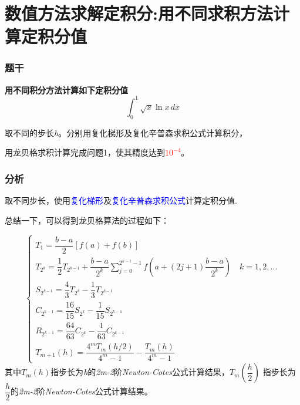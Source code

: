 \documentclass{njureport}
\begin{document}
\makecover
\pagestyle{plain}
\part{数值方法求解定积分:用不同求积方法计算定积分值}

\section{题干}
  \textbf{用不同积分方法计算如下定积分值}
    $$\int _0^1\sqrt{x}\ln{x} \,dx$$

  \begin{description}[itemindent=1em]
  \item[算法1]    取不同的步长\emph{h}。分别用复化梯形及复化辛普森求积公式计算积分，
  \item[算法2]    用龙贝格求积计算完成问题1，使其精度达到\textcolor{red}{$10^{-4}$}。
  \end{description}
\section{分析}
 \begin{description}[itemindent=1em]
  \item[算法1] 取不同步长，使用{\textcolor{blue}{复化梯形}}及{\textcolor{blue}{复化辛普森求积公式}}计算定积分值.
  \item[算法2] 总结一下，可以得到龙贝格算法的过程如下：

$$
    \left\{\begin{array}{lcl}
     T_1=\dfrac{b-a}{2}[f(a)+f(b)]\\[1em]
     T_{2^k}=\dfrac{1}{2}T_{2^{k-1}}+\dfrac{b-a}{2^k} \sum_{j=0}^{2^{k-1}-1}f(a+(2j+1)\dfrac{b-a}{2^k})\quad k=1,2,\ldots\\[1em]
     S_{2^{k-1}}=\dfrac{4}{3}T_{2^k}-\dfrac{1}{3}T_{2^{k-1}}\\[1em]
     C_{2^{k-1}}=\dfrac{16}{15}S_{2^k}-\dfrac{1}{15}S_{2^{k-1}}\\[1em]
     R_{2^{k-1}}=\dfrac{64}{63}C_{2^k}-\dfrac{1}{63}C_{2^{k-1}}\\[1em]
     T_{m+1}(h)=\dfrac{4^mT_m(h/2)}{4^m-1}-\dfrac{T_m(h)}{4^m-1}
    \end{array}\right.$$
    其中$T_m(h)$指步长为\emph{h}的\emph{2m-2}阶\emph{Newton-Cotes}公式计算结果，$T_m(\dfrac{h}2)$ 指步长为${\dfrac{h}2}$的\emph{2m-2}阶\emph{Newton-Cotes}公式计算结果。
 \end{description}
\end{document}
